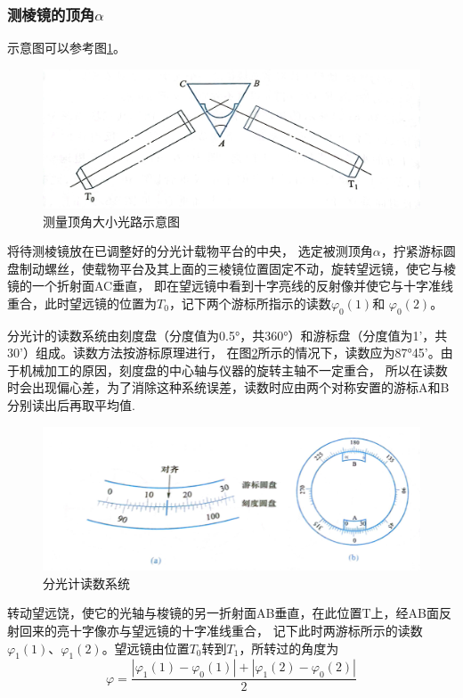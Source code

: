 \documentclass{ctexart}
\begin{document}
    \subsubsection{测棱镜的顶角$\alpha$}
    示意图可以参考图\ref{cedingjiao}。
    \begin{figure}[H]
      \centering
      \includegraphics[height=0.2\textwidth,width=1\textwidth]{cedingjiaoguanglu.jpg}
      \caption{测量顶角大小光路示意图}\label{cedingjiao}
    \end{figure}

    将待测棱镜放在已调整好的分光计载物平台的中央，
    选定被测顶角$\alpha$，拧紧游标圆盘制动螺丝，使载物平台及其上面的三棱镜位置固定不动，旋转望远镜，使它与棱镜的一个折射面AC垂直，
    即在望远镜中看到十字亮线的反射像并使它与十字准线重合，此时望远镜的位置为$T_{0}$，记下两个游标所指示的读数$\varphi_{0}(1)$和
    $\varphi_{0}(2)$。

    分光计的读数系统由刻度盘（分度值为0.5°，共360°）和游标盘（分度值为1'，共30'）组成。读数方法按游标原理进行，
    在图\ref{kedupan}所示的情况下，读数应为87°45'。由于机械加工的原因，刻度盘的中心轴与仪器的旋转主轴不一定重合，
    所以在读数时会出现偏心差，为了消除这种系统误差，读数时应由两个对称安置的游标A和B分别读出后再取平均值.
    \begin{figure}[H]
      \centering
      \includegraphics[height=0.4\textwidth,width=1\textwidth]{kedupan.jpg}
      \caption{分光计读数系统}\label{kedupan}
    \end{figure}

    转动望远饶，使它的光轴与梭镜的另一折射面AB垂直，在此位置T上，经AB面反射回来的亮十字像亦与望远镜的十字准线重合，
    记下此时两游标所示的读数$\varphi_{1}(1)$、$\varphi_{1}(2)$。望远镜由位置$T_{0}$转到$T_{1}$，所转过的角度为
    \begin{equation}
      \varphi=\frac{|\varphi_{1}(1)-\varphi_{0}(1)|+|\varphi_{1}(2)-\varphi_{0}(2)|}{2}
    \end{equation}
\end{document}
